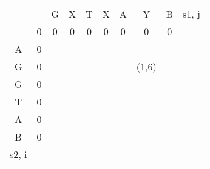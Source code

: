 \begin{minipage}[c]{0.68\textwidth}
	\begin{center}
		\begin{tabular}{cccccccccl}
			                          &                        & G                      & X                      & T                      & X                      & A                      & Y                          & B                      & s1, j \\ \cline{2-9}
			\multicolumn{1}{c|}{}     & \multicolumn{1}{c|}{0} & \multicolumn{1}{c|}{0} & \multicolumn{1}{c|}{0} & \multicolumn{1}{c|}{0} & \multicolumn{1}{c|}{0} & \multicolumn{1}{c|}{0} & \multicolumn{1}{c|}{0}     & \multicolumn{1}{c|}{0} &       \\ \cline{2-9}
			\multicolumn{1}{c|}{A}    & \multicolumn{1}{c|}{0} & \multicolumn{1}{c|}{}  & \multicolumn{1}{c|}{}  & \multicolumn{1}{c|}{}  & \multicolumn{1}{c|}{}  & \multicolumn{1}{c|}{}  & \multicolumn{1}{c|}{}      & \multicolumn{1}{c|}{}  &       \\ \cline{2-9}
			\multicolumn{1}{c|}{G}    & \multicolumn{1}{c|}{0} & \multicolumn{1}{c|}{}  & \multicolumn{1}{c|}{}  & \multicolumn{1}{c|}{}  & \multicolumn{1}{c|}{}  & \multicolumn{1}{c|}{}  & \multicolumn{1}{c|}{(1,6)} & \multicolumn{1}{c|}{}  &       \\ \cline{2-9}
			\multicolumn{1}{c|}{G}    & \multicolumn{1}{c|}{0} & \multicolumn{1}{c|}{}  & \multicolumn{1}{c|}{}  & \multicolumn{1}{c|}{}  & \multicolumn{1}{c|}{}  & \multicolumn{1}{c|}{}  & \multicolumn{1}{c|}{}      & \multicolumn{1}{c|}{}  &       \\ \cline{2-9}
			\multicolumn{1}{c|}{T}    & \multicolumn{1}{c|}{0} & \multicolumn{1}{c|}{}  & \multicolumn{1}{c|}{}  & \multicolumn{1}{c|}{}  & \multicolumn{1}{c|}{}  & \multicolumn{1}{c|}{}  & \multicolumn{1}{c|}{}      & \multicolumn{1}{c|}{}  &       \\ \cline{2-9}
			\multicolumn{1}{c|}{A}    & \multicolumn{1}{c|}{0} & \multicolumn{1}{c|}{}  & \multicolumn{1}{c|}{}  & \multicolumn{1}{c|}{}  & \multicolumn{1}{c|}{}  & \multicolumn{1}{c|}{}  & \multicolumn{1}{c|}{}      & \multicolumn{1}{c|}{}  &       \\ \cline{2-9}
			\multicolumn{1}{c|}{B}    & \multicolumn{1}{c|}{0} & \multicolumn{1}{c|}{}  & \multicolumn{1}{c|}{}  & \multicolumn{1}{c|}{}  & \multicolumn{1}{c|}{}  & \multicolumn{1}{c|}{}  & \multicolumn{1}{c|}{}      & \multicolumn{1}{c|}{}  &       \\ \cline{2-9}
			\multicolumn{1}{l}{s2, i} & \multicolumn{1}{l}{}   & \multicolumn{1}{l}{}   & \multicolumn{1}{l}{}   & \multicolumn{1}{l}{}   & \multicolumn{1}{l}{}   & \multicolumn{1}{l}{}   & \multicolumn{1}{l}{}       & \multicolumn{1}{l}{}   &
		\end{tabular}
	\end{center}
\end{minipage}
